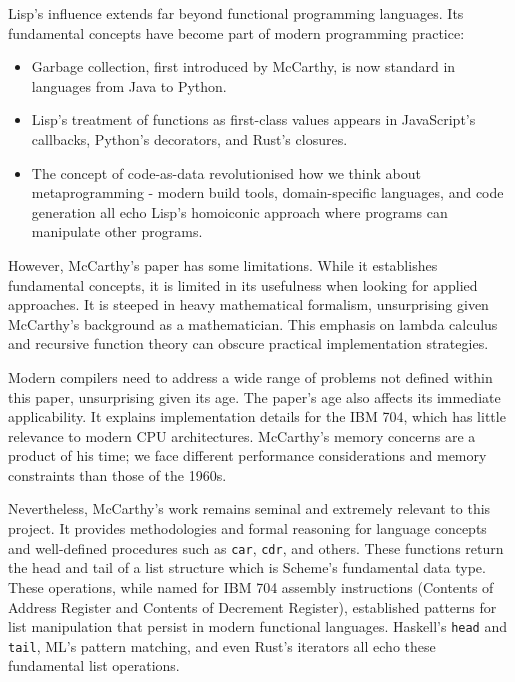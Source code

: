 \documentclass[final]{cmpreport_02}
\begin{document}
Lisp's influence extends far beyond functional programming languages. Its fundamental concepts have become part of modern programming practice:
\begin{itemize}[noitemsep]
    \item Garbage collection, first introduced by McCarthy, is now standard in languages from Java to Python.
    \item Lisp's treatment of functions as first-class values appears in JavaScript's callbacks, Python's decorators, and Rust's closures.
    \item The concept of code-as-data revolutionised how we think about metaprogramming - modern build tools, domain-specific languages, and code generation all echo Lisp's homoiconic approach where programs can manipulate other programs.
\end{itemize}

However, McCarthy's paper has some limitations. While it establishes fundamental concepts, it is limited in its usefulness when looking for applied approaches. It is steeped in heavy mathematical formalism, unsurprising given McCarthy's background as a mathematician. This emphasis on lambda calculus and recursive function theory can obscure practical implementation strategies.\newline

Modern compilers need to address a wide range of problems not defined within this paper, unsurprising given its age. The paper's age also affects its immediate applicability. It explains implementation details for the IBM 704, which has little relevance to modern CPU architectures. McCarthy's memory concerns are a product of his time; we face different performance considerations and memory constraints than those of the 1960s.\newline

Nevertheless, McCarthy's work remains seminal and extremely relevant to this project. It provides methodologies and formal reasoning for language concepts and well-defined procedures such as \texttt{car}, \texttt{cdr}, and others. These functions return the head and tail of a list structure which is Scheme's fundamental data type. These operations, while named for IBM 704 assembly instructions (Contents of Address Register and Contents of Decrement Register), established patterns for list manipulation that persist in modern functional languages. Haskell's \texttt{head} and \texttt{tail}, ML's pattern matching, and even Rust's iterators all echo these fundamental list operations.\newline
\end{document}

